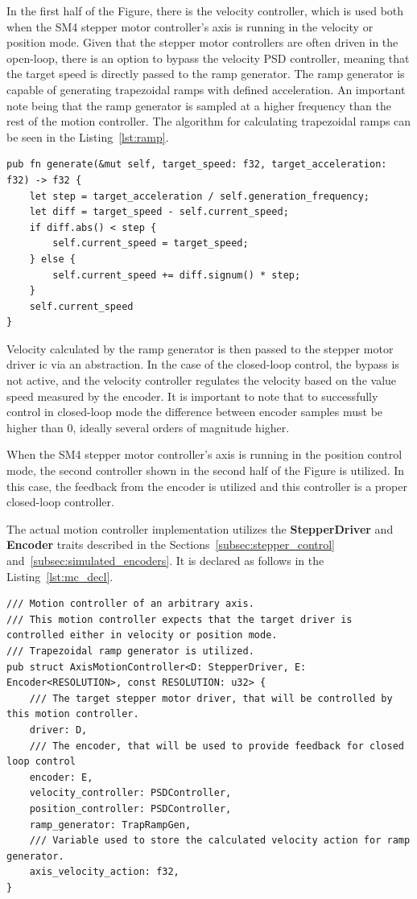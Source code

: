 In the first half of the Figure, there is the velocity controller, which is used both when the SM4 stepper motor controller's axis is running in the velocity or position mode.
Given that the stepper motor controllers are often driven in the open-loop, there is an option to bypass the velocity PSD controller, meaning that the target speed is directly passed to the ramp generator.
The ramp generator is capable of generating trapezoidal ramps with defined acceleration.
An important note being that the ramp generator is sampled at a higher frequency than the rest of the motion controller.
The algorithm for calculating trapezoidal ramps can be seen in the Listing~\ref{lst:ramp}.
\begin{lstlisting}[caption={Calculating trapezoidal ramps.},label=lst:ramp]
pub fn generate(&mut self, target_speed: f32, target_acceleration: f32) -> f32 {
    let step = target_acceleration / self.generation_frequency;
    let diff = target_speed - self.current_speed;
    if diff.abs() < step {
        self.current_speed = target_speed;
    } else {
        self.current_speed += diff.signum() * step;
    }
    self.current_speed
}
\end{lstlisting}

Velocity calculated by the ramp generator is then passed to the stepper motor driver \acs{ic} via an abstraction.
In the case of the closed-loop control, the bypass is not active, and the velocity controller regulates the velocity based on the value speed measured by the encoder.
It is important to note that to successfully control in closed-loop mode the difference between encoder samples must be higher than 0, ideally several orders of magnitude higher.

When the SM4 stepper motor controller's axis is running in the position control mode, the second controller shown in the second half of the Figure is utilized.
In this case, the feedback from the encoder is utilized and this controller is a proper closed-loop controller.

The actual motion controller implementation utilizes the \textbf{StepperDriver} and \textbf{Encoder} traits described in the Sections~\ref{subsec:stepper_control} and~\ref{subsec:simulated_encoders}.
It is declared as follows in the Listing~\ref{lst:mc_decl}.
\begin{lstlisting}[caption={Implementation of the PSD controller with integrator.},label=lst:mc_decl]
/// Motion controller of an arbitrary axis.
/// This motion controller expects that the target driver is controlled either in velocity or position mode.
/// Trapezoidal ramp generator is utilized.
pub struct AxisMotionController<D: StepperDriver, E: Encoder<RESOLUTION>, const RESOLUTION: u32> {
    /// The target stepper motor driver, that will be controlled by this motion controller.
    driver: D,
    /// The encoder, that will be used to provide feedback for closed loop control
    encoder: E,
    velocity_controller: PSDController,
    position_controller: PSDController,
    ramp_generator: TrapRampGen,
    /// Variable used to store the calculated velocity action for ramp generator.
    axis_velocity_action: f32,
}
\end{lstlisting}

